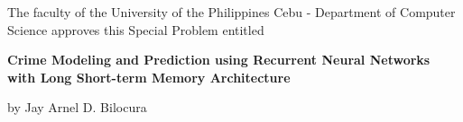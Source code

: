\begin{approval}
    \par The faculty of the University of the Philippines Cebu - Department of Computer Science approves this Special Problem entitled
    \vspace{1in}
    \par\textbf{Crime Modeling and Prediction using Recurrent Neural Networks with Long Short-term Memory Architecture}
    \vspace{1in}
    \par by Jay Arnel D. Bilocura
    \vspace{1in}

    \par\noindent\makebox[2.5in]{\hrulefill}
    \hfill\makebox[2.5in]{\hrulefill}

    \par\noindent{}
    \hfill{}

    \par\noindent{}
    \hfill{}

    \vspace{1in}

    \par\noindent\makebox[2.5in]{\hrulefill}
    \hfill\makebox[2.5in]{\hrulefill}

    \par\noindent{}
    \hfill{}
\end{approval}